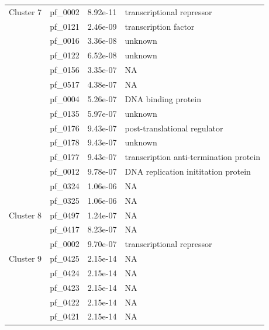 \begin{table}
\begin{lrbox}{\rightbox}
\begin{tabular}[t]{llll}
            \multirow{1}{*}{Cluster 7} & pf\_0002 & 8.92e-11 & transcriptional repressor \\ 
                                        & pf\_0121 & 2.46e-09 & transcription factor  \\ 
                                        & pf\_0016 & 3.36e-08 & unknown \\ 
                                        & pf\_0122 & 6.52e-08 & unknown \\ 
                                        & pf\_0156 & 3.35e-07 & NA \\ 
                                        & pf\_0517 & 4.38e-07 & NA \\ 
                                        & pf\_0004 & 5.26e-07 & DNA binding protein \\ 
                                        & pf\_0135 & 5.97e-07 & unknown \\ 
                                        & pf\_0176 & 9.43e-07 & post-translational regulator \\ 
                                        & pf\_0178 & 9.43e-07 & unknown \\ 
                                        & pf\_0177 & 9.43e-07 & transcription anti-termination protein \\ 
                                        & pf\_0012 & 9.78e-07 & DNA replication inititation protein \\ 
                                        & pf\_0324 & 1.06e-06 & NA \\ 
                                        & pf\_0325 & 1.06e-06 & NA \\ 
            \midrule
            \multirow{1}{*}{Cluster 8} & pf\_0497 & 1.24e-07 & NA \\ 
                                        & pf\_0417 & 8.23e-07 & NA \\ 
                                        & pf\_0002 & 9.70e-07 & transcriptional repressor \\ 
            \midrule
            \multirow{1}{*}{Cluster 9} & pf\_0425 & 2.15e-14 & NA \\ 
                                        & pf\_0424 & 2.15e-14 & NA \\ 
                                        & pf\_0423 & 2.15e-14 & NA \\ 
                                        & pf\_0422 & 2.15e-14 & NA \\ 
                                        & pf\_0421 & 2.15e-14 & NA \\ 

\end{tabular}
\end{lrbox}
\end{table}
